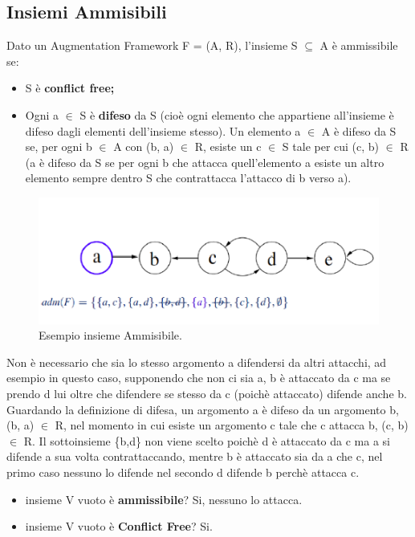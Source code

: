 \subsection{Insiemi Ammisibili}
Dato un Augmentation Framework F = (A, R), l’insieme S $\subseteq$ A è ammissibile se:
\begin{itemize}
    \item S è \textbf{conflict free;}
    \item Ogni a $\in$ S è \textbf{difeso} da S (cioè ogni elemento che appartiene all’insieme è difeso dagli elementi dell’insieme stesso). Un elemento a $\in$ A è difeso da S se, per ogni b $\in$ A con (b, a) $\in$ R, esiste un c $\in$ S tale per cui (c, b) $\in$ R (a è difeso da S se per ogni b che attacca quell’elemento a esiste un altro elemento sempre dentro S che contrattacca l’attacco di b verso a).
\end{itemize}
\begin{figure}[htp]
	\centering
    \includegraphics[width=12cm, keepaspectratio]{img/Cap6/ammissibile.png}
    \caption{Esempio insieme Ammisibile.}
\end{figure}
Non è necessario che sia lo stesso argomento a difendersi da altri attacchi, ad esempio in questo caso, supponendo che non ci sia a, b è attaccato da c ma se prendo d lui oltre che difendere se stesso da c (poichè attaccato) difende anche b. Guardando la definizione di difesa, un argomento a è difeso da un argomento b, (b, a) $\in$ R, nel momento in cui esiste un argomento c tale che c attacca b, (c, b) $\in$ R. Il sottoinsieme \{b,d\} non viene scelto poichè d è attaccato da c ma a si difende a sua volta contrattaccando, mentre b è attaccato sia da a che c, nel primo caso nessuno lo difende nel secondo d difende b perchè attacca c.
\begin{itemize}
    \item insieme V vuoto è \textbf{ammissibile}? Si, nessuno lo attacca.
    \item insieme V vuoto è \textbf{Conflict Free}? Si.
\end{itemize}
\newpage
